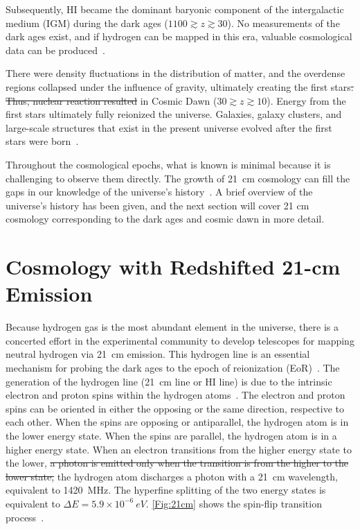 Subsequently, HI became the dominant baryonic component of the intergalactic medium (IGM) during the dark ages ($1100 \gtrsim z \gtrsim 30$). No measurements of the dark ages exist, and if hydrogen can be mapped in this era, valuable cosmological data can be produced~\citep{11, 2004PhRvL..92u1301L}.

There were density fluctuations in the distribution of matter, and the overdense regions collapsed under the influence of gravity, ultimately creating the first stars\st{. Thus, nuclear reaction resulted}  in Cosmic Dawn ($30\gtrsim z \gtrsim 10$). Energy from the first stars ultimately fully reionized the universe. Galaxies, galaxy clusters, and large-scale structures that exist in the present universe evolved after the first stars were born~\citep{2017arXiv170808521D, 2012AdSpR..49..433B}. 

Throughout the cosmological epochs, what is known is minimal because it is challenging to observe them directly. The growth of \SI{21}{cm} cosmology can fill the gaps in our knowledge of the universe's history~\citep{2012RPPh...75h6901P}. A brief overview of the universe's history has been given, and the next section will cover 21 cm cosmology corresponding to the dark ages and cosmic dawn in more detail.

\section{Cosmology with Redshifted 21-cm Emission}

Because hydrogen gas is the most abundant element in the universe, there is a concerted effort in the experimental community to develop telescopes for mapping neutral hydrogen via \SI{21}{cm} emission. This hydrogen line is an essential mechanism for probing the dark ages to the epoch of reionization (EoR)~\citep{2013PhRvD..87d3002L,2014ApJ...782...66P}. The generation of the hydrogen line (\SI{21}{cm} line or HI line) is due to the intrinsic electron and proton spins within the hydrogen atoms~\citep{book:832129}. The electron and proton spins can be oriented in either the opposing or the same direction, respective to each other. When the spins are opposing or antiparallel, the hydrogen atom is in the lower energy state. When the spins are parallel, the hydrogen atom is in a higher energy state. When an electron transitions from the higher energy state to the lower, \st{a photon is emitted only when the transition is from the higher to the lower state,} the hydrogen atom discharges a photon with a \SI{21}{cm} wavelength, equivalent to \SI{1420}{MHz}. The hyperfine splitting of the two energy states is equivalent to \(\Delta E =  5.9 \times 10^{-6} \ eV\). \autoref{Fig:21cm} shows the spin-flip transition process~\citep{16, book:832129}.


